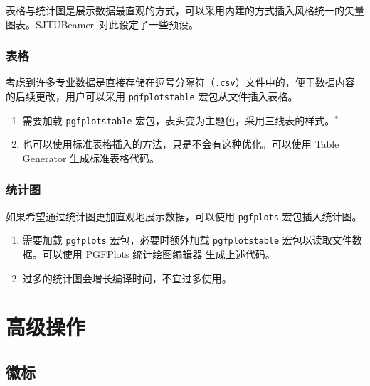 \documentclass[
    UTF8,
    heading=true,
    12pt,
    a4paper
]{ctexrep}
\def\themename{\textsf{SJTUBeamer}}
\begin{document}
    表格与统计图是展示数据最直观的方式，可以采用内建的方式插入风格统一的矢量图表。\themename\ 对此设定了一些预设。

    \section{表格}

    考虑到许多专业数据是直接存储在逗号分隔符（\texttt{.csv}）文件中的，便于数据内容的后续更改，用户可以采用 \texttt{pgfplotstable} 宏包从文件插入表格。


    \begin{enumerate}\small
        \item 需要加载 \texttt{pgfplotstable} 宏包，表头变为主题色，采用三线表的样式。$^*$
        \item 也可以使用标准表格插入的方法，只是不会有这种优化。可以使用 \href{https://www.tablesgenerator.com/latex_tables}{Table Generator} 生成标准表格代码。
    \end{enumerate}

    \section{统计图}

    如果希望通过统计图更加直观地展示数据，可以使用 \texttt{pgfplots} 宏包插入统计图。


    \begin{enumerate}\small
        \item 需要加载 \texttt{pgfplots} 宏包，必要时额外加载 \texttt{pgfplotstable} 宏包以读取文件数据。可以使用 \href{https://logcreative.github.io/PGFPlotsEdt/}{PGFPlots 统计绘图编辑器} 生成上述代码。
        \item[\faWarning] 过多的统计图会增长编译时间，不宜过多使用。
    \end{enumerate}


    \part{高级操作}
    \chapter{徽标}
\end{document}
